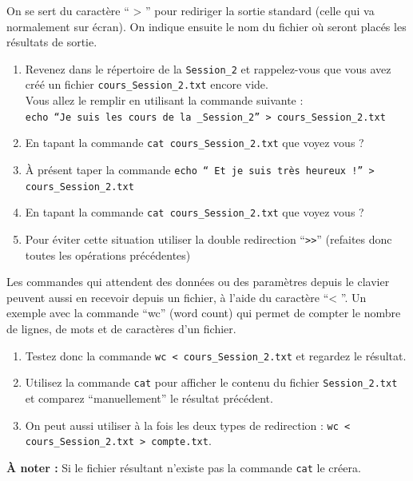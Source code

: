 \documentclass{article}
\begin{document}
\begin{exercice}[En sortie]

On se sert du caractère `` > '' pour rediriger la sortie standard (celle qui va normalement sur écran). On indique ensuite le nom du fichier où seront placés les résultats de sortie.

\begin{enumerate}

\item
Revenez dans le répertoire de la \texttt{Session\_2} et rappelez-vous que vous avez créé un fichier \texttt{cours\_{Session\_2}.txt} encore vide. \\
Vous allez le remplir en utilisant la commande suivante : \\
\texttt{echo ``Je suis les cours de la \_Session\_2'' > cours\_Session\_2.txt}
\item
En tapant la commande \texttt{cat cours\_Session\_2.txt} que voyez vous ?
\item
À présent taper la commande \texttt{echo `` Et je suis très heureux !'' > cours\_Session\_2.txt}
\item
En tapant la commande \texttt{cat cours\_Session\_2.txt} que voyez vous ?
\item
Pour éviter cette situation utiliser la double redirection ``\verb+>>+'' (refaites donc toutes les opérations précédentes)

\end{enumerate}

\end{exercice}

\begin{exercice}[En entrée]

Les commandes qui attendent des données ou des paramètres depuis le clavier peuvent aussi en recevoir depuis un fichier, à l'aide du caractère ``< ''. 
Un exemple avec la commande ``wc'' (word count) qui permet de compter le nombre de lignes, de mots et de caractères d'un fichier.

\begin{enumerate}
\item
Testez donc la commande \texttt{wc < cours\_{Session\_2}.txt} et regardez le résultat.
\item
Utilisez la commande \texttt{cat} pour afficher le contenu du fichier \texttt{Session\_2.txt} et comparez ``manuellement'' le résultat précédent.
\item
On peut aussi utiliser à la fois les deux types de redirection : \texttt{wc < cours\_{Session\_2}.txt > compte.txt}.
\end{enumerate}

 \textbf{À noter : } Si le fichier résultant n'existe pas la commande \texttt{cat} le créera.

\end{exercice}
\end{document}
